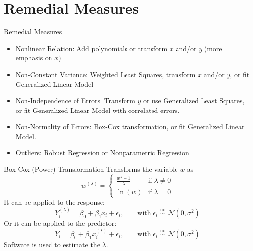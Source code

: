 \documentclass{beamer}
\begin{document}
\section{Remedial Measures}

\begin{frame}{Remedial Measures}
\begin{itemize}
    \item Nonlinear Relation: \pause Add polynomials or transform $x$ and/or $y$ (more emphasis on $x$)
    \item\pause Non-Constant Variance: \pause Weighted Least Squares, transform $x$ and/or $y$, or fit Generalized Linear Model
    \item\pause Non-Independence of Errors: \pause Transform $y$ or use Generalized Least Squares, or fit Generalized Linear Model with correlated errors.
    \item\pause Non-Normality of Errors: \pause Box-Cox transformation, or fit Generalized Linear Model.
    \item\pause Outliers: \pause Robust Regression or Nonparametric Regression
\end{itemize}    
\end{frame}

\begin{frame}{Box-Cox (Power) Transformation}
Transforms the variable $w$ as
$$
w^{(\lambda)}=\begin{cases}
\frac{w^\lambda-1}{\lambda}&\text{if }\lambda\ne0\\
\ln(w)&\text{if }\lambda=0
\end{cases}
$$
\pause It can be applied to the response:
$$
Y_i^{(\lambda)}=\beta_0+\beta_1x_i+\epsilon_i,\qquad\text{with }\epsilon_i\,\,{\stackrel{\text{iid}}{\sim}}\,\,\mathcal{N}(0,\sigma^2)
$$
\pause Or it can be applied to the predictor:
$$
Y_i=\beta_0+\beta_1x_i^{(\lambda)}+\epsilon_i,\qquad\text{with }\epsilon_i\,\,{\stackrel{\text{iid}}{\sim}}\,\,\mathcal{N}(0,\sigma^2)
$$
\pause Software is used to estimate the $\lambda$.
\end{frame}
\end{document}
